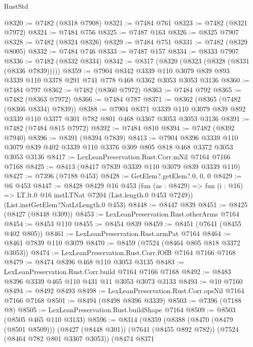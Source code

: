\begin{lexlean}{RustStd}
\begin{coremodule}
@8320 := @7482 (@8318 @7908)
@8321 := @7484 @761
@8323 := @7482 (@8321 @7972)
@8324 := @7484 @756
@8325 := @7487 @163
@8326 := @8325 @7907
@8328 := @7482 (@8324 @8326)
@8329 := @7484 @751
@8331 := @7482 (@8329 @8005)
@8332 := @7484 @746
@8333 := @7487 @157
@8334 := @8333 @7907
@8336 := @7482 (@8332 @8334)
@8342 := @8317 (@8320 (@8323 (@8328 (@8331 (@8336 @7839)))))
@8359 := @7904
    @8342
    @3339
    @110
    @3079
    @839
    @893
    @3339
    @110
    @3378
    @291
    @741
    @778
    @468
    @3362
    @3053
    @3053
    @3136
@8360 := @7484 @797
@8362 := @7482 (@8360 @7972)
@8363 := @7484 @792
@8365 := @7482 (@8363 @7972)
@8366 := @7484 @787
@8371 := @8362 (@8365 (@7482 (@8366 @8334) @7839))
@8388 := @7904
    @8371
    @3339
    @110
    @3079
    @839
    @892
    @3339
    @110
    @3377
    @301
    @782
    @801
    @468
    @3367
    @3053
    @3053
    @3136
@8391 := @7482 (@7484 @815 @7972)
@8392 := @7484 @810
@8394 := @7482 (@8392 @7940)
@8396 := @8391 (@8394 @7839)
@8413 := @7904
    @8396
    @3339
    @110
    @3079
    @839
    @402
    @3339
    @110
    @3376
    @309
    @805
    @818
    @468
    @3372
    @3053
    @3053
    @3136
@8417 := LexLeanPreservation.Rust.Corr.mNil @7164 @7166 @7168
@8425 := @8413 (@8417 @7839 @3339 @110 @3079 @839 @3339 @110)
@8427 := @7396 (@7188 @453)
@8428 := GetElem?.getElem?.{0, 0, 0}
@8429 := @6 @453
@8447 := @8428
    @8429
    @16
    @453
    (fun (as : @8429) =>
    fun (i : @16) => LT.lt.{0} @16 instLTNat @7204 (List.length.{0} @453 @7249))
    (List.instGetElem?NatLtLength.{0} @453)
@8448 := @8447 @839
@8451 := @8425 (@8427 (@8448 @309))
@8453 := LexLeanPreservation.Rust.otherArms @7164
@8454 := @8453 @110
@8455 := @8454 @839
@8459 := @8451 (@7641 (@8455 @402 @805))
@8461 := LexLeanPreservation.Rust.armPat @7164
@8464 := @8461 @7839 @110 @3079
@8470 := @8459 (@7524 (@8464 @805 @818 @3372 @3053))
@8474 := LexLeanPreservation.Rust.Corr.fOfB @7164 @7166 @7168
@8479 := @8474 @8396 @468 @110 @3053 @3135
@8483 := LexLeanPreservation.Rust.Corr.build @7164 @7166 @7168
@8492 := @8483 @8396 @3339 @465 @110 @431 @11 @3053 @3073 @3133
@8493 := @10 @7160
@8494 := @8492 @8493
@8498 := LexLeanPreservation.Rust.Corr.opsNil @7164 @7166 @7168
@8501 := @8494 (@8498 @8396 @3339)
@8503 := @7396 (@7188 @8)
@8505 := LexLeanPreservation.Rust.buildShape @7164
@8509 := @8503 (@8505 @465 @110 @3133)
@8596 := @8314
    (@8359
      (@8388
        (@8470 (@8479 (@8501 @8509)))
        (@8427 (@8448 @301))
        (@7641 (@8455 @892 @782))
        (@7524 (@8464 @782 @801 @3367 @3053))
        (@8474
          @8371

\end{coremodule}
\end{lexlean}
